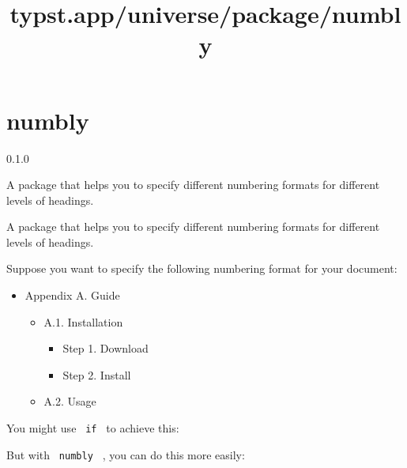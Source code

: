 \title{typst.app/universe/package/numbly}

\label{banner}
\section{numbly}\label{numbly}

{ 0.1.0 }

A package that helps you to specify different numbering formats for
different levels of headings.

\label{readme}
A package that helps you to specify different numbering formats for
different levels of headings.

Suppose you want to specify the following numbering format for your
document:

\begin{itemize}
\tightlist
\item
  Appendix A. Guide

  \begin{itemize}
  \tightlist
  \item
    A.1. Installation

    \begin{itemize}
    \tightlist
    \item
      Step 1. Download
    \item
      Step 2. Install
    \end{itemize}
  \item
    A.2. Usage
  \end{itemize}
\end{itemize}

You might use \texttt{\ if\ } to achieve this:

\begin{Shaded}
\begin{Highlighting}[]
\NormalTok{  \}}
\NormalTok{\})}

\end{Highlighting}
\end{Shaded}

But with \texttt{\ numbly\ } , you can do this more easily:


